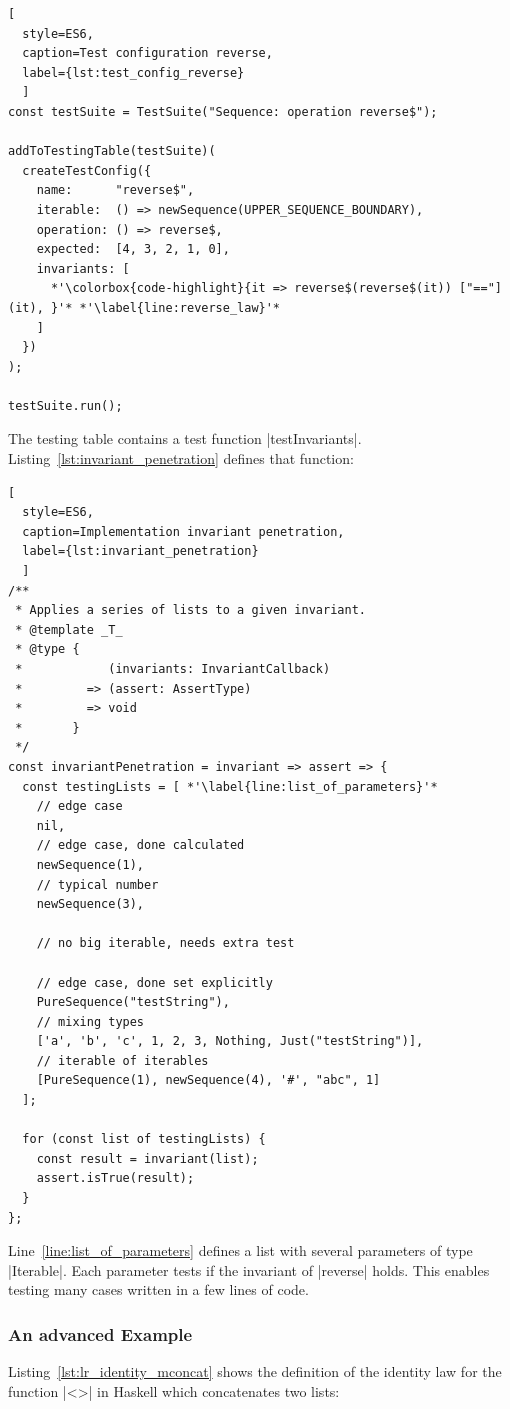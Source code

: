 \begin{lstlisting}[
  style=ES6, 
  caption=Test configuration reverse,
  label={lst:test_config_reverse}
  ]
const testSuite = TestSuite("Sequence: operation reverse$");

addToTestingTable(testSuite)(
  createTestConfig({
    name:      "reverse$",
    iterable:  () => newSequence(UPPER_SEQUENCE_BOUNDARY),
    operation: () => reverse$,
    expected:  [4, 3, 2, 1, 0],
    invariants: [
      *'\colorbox{code-highlight}{it => reverse$(reverse$(it)) ["=="] (it), }'* *'\label{line:reverse_law}'*
    ]
  })
);

testSuite.run();
\end{lstlisting}
The testing table contains a test function |testInvariants|.
Listing~\ref{lst:invariant_penetration} defines that function:

\begin{lstlisting}[
  style=ES6, 
  caption=Implementation invariant penetration,
  label={lst:invariant_penetration}
  ]
/**
 * Applies a series of lists to a given invariant.
 * @template _T_
 * @type {
 *            (invariants: InvariantCallback)
 *         => (assert: AssertType)
 *         => void
 *       }
 */
const invariantPenetration = invariant => assert => {
  const testingLists = [ *'\label{line:list_of_parameters}'*
    // edge case
    nil,                                                   
    // edge case, done calculated
    newSequence(1),                                        
    // typical number
    newSequence(3),                                        

    // no big iterable, needs extra test

    // edge case, done set explicitly
    PureSequence("testString"),                            
    // mixing types
    ['a', 'b', 'c', 1, 2, 3, Nothing, Just("testString")], 
    // iterable of iterables
    [PureSequence(1), newSequence(4), '#', "abc", 1]       
  ];

  for (const list of testingLists) {
    const result = invariant(list);
    assert.isTrue(result);
  }
};
\end{lstlisting}

Line~\ref{line:list_of_parameters} defines a list with several parameters of
type |Iterable|. Each parameter tests if the invariant of |reverse| holds. 
This enables testing many cases written in a few lines of code.

\subsubsection{An advanced Example}
\label{subsub:An advanced Example}
Listing~\ref{lst:lr_identity_mconcat} shows the definition of the identity law
for the function |<>| in Haskell which concatenates two lists:

